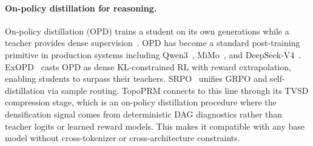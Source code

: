 \paragraph{On-policy distillation for reasoning.}
On-policy distillation (OPD) trains a student on its own generations
while a teacher provides dense
supervision~\citep{minillm2023,agarwal2024gkd}.
OPD has become a standard post-training primitive in production systems
including Qwen3~\citep{qwen3_2025}, MiMo~\citep{mimo2026},
and DeepSeek-V4~\citep{deepseekv4_2026}.
ExOPD~\citep{exopd2026} casts OPD as dense KL-constrained RL with
reward extrapolation, enabling students to surpass their teachers.
SRPO~\citep{srpo2026} unifies GRPO and self-distillation via
sample routing.
TopoPRM connects to this line through its TVSD compression stage,
which is an on-policy distillation procedure where the densification
signal comes from deterministic DAG diagnostics rather than teacher
logits or learned reward models. This makes it compatible with any
base model without cross-tokenizer or cross-architecture constraints.
